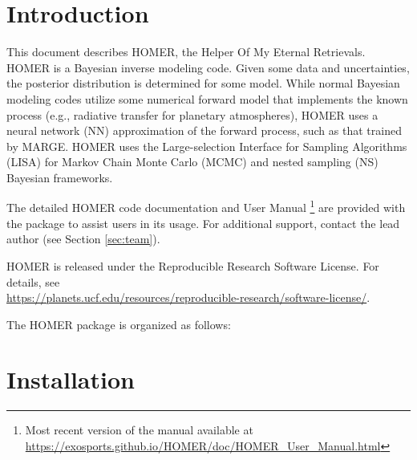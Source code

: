 \documentclass[letterpaper, 12pt]{article}
\begin{document}
\section{Introduction}
\label{sec:theory}

\noindent This document describes HOMER, the Helper Of My Eternal Retrievals. 
HOMER is a Bayesian inverse modeling code.  Given some data and 
uncertainties, the posterior distribution is determined for some model. 
While normal Bayesian modeling codes utilize some numerical forward model 
that implements the known process (e.g., radiative transfer for planetary 
atmospheres), HOMER uses a neural network (NN) approximation of the forward 
process, such as that trained by MARGE.  HOMER uses the Large-selection 
Interface for Sampling Algorithms (LISA) for Markov Chain Monte Carlo (MCMC) 
and nested sampling (NS) Bayesian frameworks.

The detailed HOMER code documentation and User Manual
\footnote{Most recent version of the manual available at 
\href{https://exosports.github.io/HOMER/doc/HOMER_User_Manual.html}{https://exosports.github.io/HOMER/doc/HOMER\_User\_Manual.html}} 
are provided with the package to assist users in its usage. 
For additional support, contact the lead author (see Section \ref{sec:team}).

HOMER is released under the Reproducible Research Software License.  
For details, see \\
\href{https://planets.ucf.edu/resources/reproducible-research/software-license/}{https://planets.ucf.edu/resources/reproducible-research/software-license/}.
\newline

\noindent The HOMER package is organized as follows: \newline
\noindent{}
\vspace{0.7cm}

\section{Installation}
\label{sec:installation}
\end{document}
